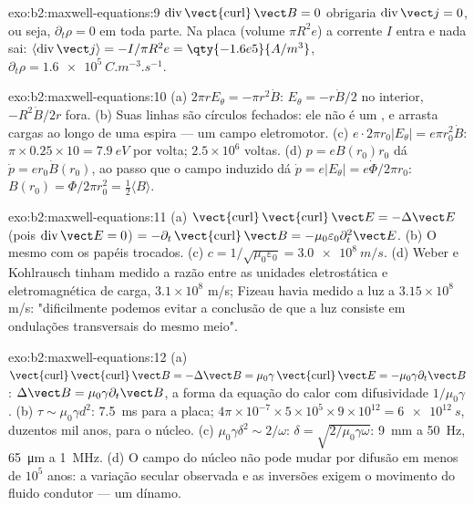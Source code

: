 \begin{solution}{exo:b2:maxwell-equations:9}
$\operatorname{div}\operatorname{\vect{curl}}\vect B = 0$ obrigaria $\operatorname{div}\vect j =
0$, ou seja, $\partial_t\rho = 0$ em toda parte. Na placa (volume $\pi R^2e$) a
corrente $I$ entra e nada sai: $\langle\operatorname{div}\vect j\rangle =
-I/\pi R^2e = \qty{-1.6e5}{A/m^3}$, $\partial_t\rho = \qty{+1.6e5}{C.m^{-3}.s^{-1}}$.
\end{solution}

\begin{solution}{exo:b2:maxwell-equations:10}
(a) $2\pi rE_\theta = -\pi r^2\dot B$: $E_\theta = -r\dot B/2$ no interior, $-R^2\dot B/2r$
fora. (b) Suas linhas são círculos fechados: ele não é um , e
arrasta cargas ao longo de uma espira --- um campo eletromotor. (c) $e\cdot2\pi r_0
|E_\theta| = e\pi r_0^2\dot B$: $\pi \times 0.25 \times 10 = \qty{7.9}{eV}$ por volta; $2.5 \times 10^6$
voltas. (d) $p = eB(r_0)r_0$ dá $\dot p = er_0\dot B(r_0)$, ao passo que o campo
induzido dá $\dot p = e|E_\theta| = e\dot\Phi/2\pi r_0$: $B(r_0) = \Phi/2\pi r_0^2 =
\tfrac12\langle B\rangle$.
\end{solution}

\begin{solution}{exo:b2:maxwell-equations:11}
(a) $\operatorname{\vect{curl}}\operatorname{\vect{curl}}\vect E = -\Delta\vect E$ (pois $\operatorname{div}
\vect E = 0$) $= -\partial_t\operatorname{\vect{curl}}\vect B = -\mu_0\varepsilon_0\partial_t^2\vect E$. (b)
O mesmo com os papéis trocados. (c) $c = 1/\sqrt{\mu_0\varepsilon_0} = \qty{3.0e8}{m/s}$.
(d) Weber e Kohlrausch tinham medido a razão entre as unidades
eletrostática e eletromagnética de carga, $3.1 \times 10^8$ m/s; Fizeau havia
medido a luz a $3.15 \times 10^8$ m/s: "dificilmente podemos evitar a
conclusão de que a luz consiste em ondulações transversais do
mesmo meio".
\end{solution}

\begin{solution}{exo:b2:maxwell-equations:12}
(a) $\operatorname{\vect{curl}}\operatorname{\vect{curl}}\vect B = -\Delta\vect B = \mu_0\gamma\operatorname{\vect{curl}}
\vect E = -\mu_0\gamma\partial_t\vect B$: $\Delta\vect B = \mu_0\gamma\partial_t\vect B$, a forma da
equação do calor com difusividade $1/\mu_0\gamma$. (b) $\tau \sim \mu_0\gamma d^2$: \qty{7.5}{ms}
para a placa; $4\pi \times 10^{-7} \times 5 \times 10^5 \times 9 \times 10^{12} = \qty{6e12}{s}$, duzentos
mil anos, para o núcleo. (c) $\mu_0\gamma\delta^2 \sim 2/\omega$: $\delta = \sqrt{2/\mu_0
\gamma\omega}$: \qty{9}{mm} a \qty{50}{Hz}, \qty{65}{\micro m} a \qty{1}{MHz}. (d) O campo
do núcleo não pode mudar por difusão em menos de $10^5$ anos: a
variação secular observada e as inversões exigem o movimento do
fluido condutor --- um dínamo.
\end{solution}

